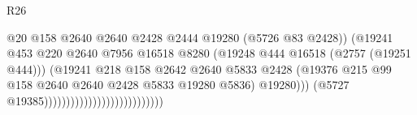 \begin{lexlean}{R26}
\begin{coremodule}
                                                            @20
                                                            @158
                                                            @2640
                                                            @2640
                                                            @2428
                                                            @2444
                                                            @19280
                                                            (@5726 @83 @2428))
                                                          (@19241
                                                            @453
                                                            @220
                                                            @2640
                                                            @7956
                                                            @16518
                                                            @8280
                                                            (@19248
                                                              @444
                                                              @16518
                                                              (@2757 (@19251 @444)))
                                                            (@19241
                                                              @218
                                                              @158
                                                              @2642
                                                              @2640
                                                              @5833
                                                              @2428
                                                              (@19376
                                                                @215
                                                                @99
                                                                @158
                                                                @2640
                                                                @2640
                                                                @2428
                                                                @5833
                                                                @19280
                                                                @5836)
                                                              @19280)))
                                                        (@5727 @19385)))))))))))))))))))))))))))

\end{coremodule}
\end{lexlean}
